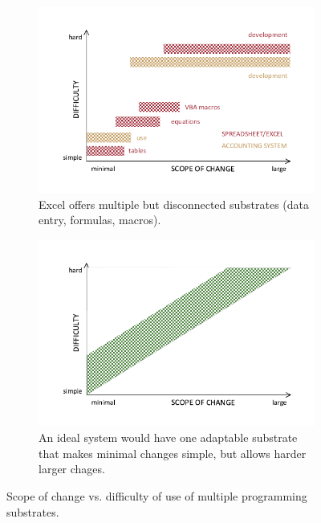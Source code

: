\documentclass[runningheads]{llncs}
\begin{document}
\begin{figure}[t]
\centering
\begin{subfigure}{0.48\textwidth}
   \noindent
   \includegraphics[scale=0.65]{figures/sub1.pdf}
   \caption{Excel offers multiple but disconnected substrates (data entry, formulas, macros).}
   \label{fig:sub1}
\end{subfigure}
\hfill
\begin{subfigure}{0.48\textwidth}
   \noindent
   \includegraphics[scale=0.65]{figures/sub2.pdf}
   \caption{An ideal system would have one adaptable substrate that makes minimal changes simple, but allows harder larger chages.}
   \label{fig:sub2}
\end{subfigure}
\caption{Scope of change vs. difficulty of use of multiple programming substrates.}
\label{fig:substrates}
\end{figure}
\end{document}
